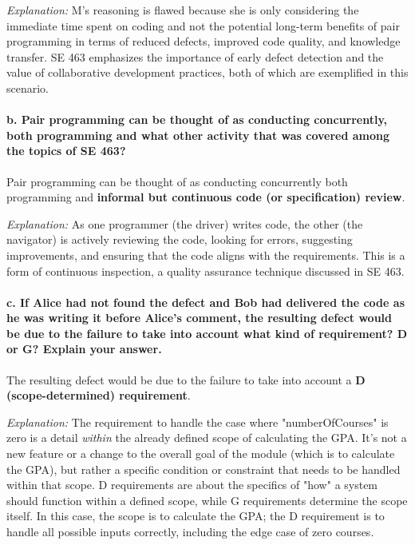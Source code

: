 \documentclass{article}
\begin{document}
\textit{Explanation:} M's reasoning is flawed because she is only considering the immediate time spent on coding and not the potential long-term benefits of pair programming in terms of reduced defects, improved code quality, and knowledge transfer. SE 463 emphasizes the importance of early defect detection and the value of collaborative development practices, both of which are exemplified in this scenario.

\paragraph{b. Pair programming can be thought of as conducting concurrently, both programming and what other activity that was covered among the topics of SE 463?}

Pair programming can be thought of as conducting concurrently both programming and \textbf{informal but continuous code (or specification) review}.

\textit{Explanation:} As one programmer (the driver) writes code, the other (the navigator) is actively reviewing the code, looking for errors, suggesting improvements, and ensuring that the code aligns with the requirements. This is a form of continuous inspection, a quality assurance technique discussed in SE 463.

\paragraph{c. If Alice had not found the defect and Bob had delivered the code as he was writing it before Alice's comment, the resulting defect would be due to the failure to take into account what kind of requirement? D or G? Explain your answer.}

The resulting defect would be due to the failure to take into account a \textbf{D (scope-determined) requirement}.

\textit{Explanation:} The requirement to handle the case where "numberOfCourses" is zero is a detail \textit{within} the already defined scope of calculating the GPA. It's not a new feature or a change to the overall goal of the module (which is to calculate the GPA), but rather a specific condition or constraint that needs to be handled within that scope. D requirements are about the specifics of "how" a system should function within a defined scope, while G requirements determine the scope itself. In this case, the scope is to calculate the GPA; the D requirement is to handle all possible inputs correctly, including the edge case of zero courses.
\end{document}

